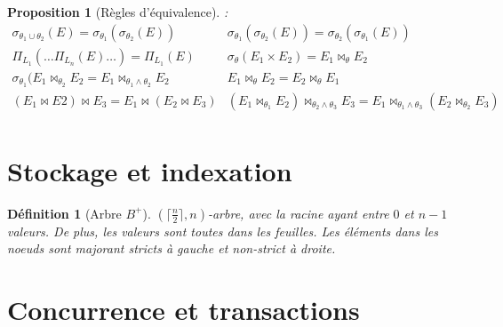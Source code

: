 \documentclass[landscape]{article}
\newcommand{\1}{\mathbbm{1}}
\newcommand{\0}{\mathbbm{0}}
\newtheorem{prop}{Proposition}
\newtheorem{defi}{Définition}
\begin{document}
\begin{multicols}{2}
    \begin{prop}[Règles d'équivalence]:\\
        \[\begin{array}{ccc}
                \sigma_{\theta_1\cup\theta_2}(E) = \sigma_{\theta_1}(\sigma_{\theta_2}(E))
             &  \sigma_{\theta_1}(\sigma_{\theta_2}(E)) = \sigma_{\theta_2}(\sigma_{\theta_1}(E))
             \\ \Pi_{L_1}(\ldots \Pi_{L_n}(E)\ldots  ) = \Pi_{L_1}(E)
             &  \sigma_\theta(E_1\times E_2) = E_1\bowtie_\theta E_2
             \\ \sigma_{\theta_1}(E_1\bowtie_{\theta_2} E_2 = E_1\bowtie_{\theta_1\wedge\theta_2} E_2
             &  E_1\bowtie_\theta E_2 = E_2\bowtie_\theta E_1
             \\ (E_1\bowtie E2)\bowtie E_3 = E_1 \bowtie (E_2\bowtie E_3)
             &  (E_1\bowtie_{\theta_1} E_2)\bowtie_{\theta_2\wedge\theta_3} E_3
                 = E_1 \bowtie_{\theta_1\wedge\theta_3} (E_2\bowtie_{\theta_2} E_3)
             \\
        \end{array}\]
    \end{prop}

    \section{Stockage et indexation}

    \begin{defi}[Arbre $B^+$]
        $(\lceil\frac{n}{2}\rceil,n)$-arbre, avec la racine ayant entre $0$ et $n-1$
        valeurs. De plus, les valeurs sont toutes dans les feuilles. Les éléments dans les
        noeuds sont majorant stricts à gauche et non-strict à droite.
    \end{defi}

    \section{Concurrence et transactions}

\end{multicols}
\end{document}
